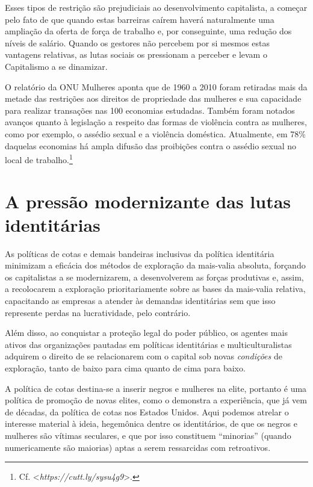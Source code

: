Esses tipos de restrição são prejudiciais ao desenvolvimento
capitalista, a começar pelo fato de que quando estas barreiras caírem
haverá naturalmente uma ampliação da oferta de força de trabalho e, por
conseguinte, uma redução dos níveis de salário. Quando os gestores não
percebem por si mesmos estas vantagens relativas, as lutas sociais os
pressionam a perceber e levam o Capitalismo a se dinamizar.

O relatório da ONU Mulheres aponta que de 1960 a 2010 foram retiradas
mais da metade das restrições aos direitos de propriedade das mulheres e
sua capacidade para realizar transações nas 100 economias estudadas.
Também foram notados avanços quanto à legislação a respeito das formas
de violência contra as mulheres, como por exemplo, o assédio sexual e a
violência doméstica. Atualmente, em 78\% daquelas economias há ampla
difusão das proibições contra o assédio sexual no local de
trabalho.\footnote{Cf. \textless{}\emph{https://cutt.ly/sysu4g9}\textgreater{}.}

\chapter{A pressão modernizante das lutas identitárias}

As políticas de cotas e demais bandeiras inclusivas da política
identitária minimizam a eficácia dos métodos de exploração da mais-valia
absoluta, forçando os capitalistas a se modernizarem, a desenvolverem as
forças produtivas e, assim, a recolocarem a exploração prioritariamente
sobre as bases da mais-valia relativa, capacitando as empresas a atender
às demandas identitárias sem que isso represente perdas na
lucratividade, pelo contrário.

Além disso, ao conquistar a proteção legal do poder público, os agentes
mais ativos das organizações pautadas em políticas identitárias e
multiculturalistas adquirem o direito de se relacionarem com o capital
sob novas \emph{condições} de exploração, tanto de baixo para cima
quanto de cima para baixo.

A política de cotas destina-se a inserir negros e mulheres na elite,
portanto é uma política de promoção de novas elites, como o demonstra a
experiência, que já vem de décadas, da política de cotas nos Estados
Unidos. Aqui podemos atrelar o interesse material à ideia, hegemônica
dentre os identitários, de que os negros e mulheres são vítimas
seculares, e que por isso constituem ``minorias'' (quando numericamente
são maiorias) aptas a serem ressarcidas com retroativos.

